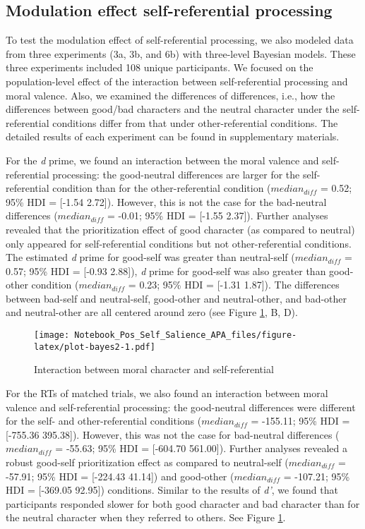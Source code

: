 \documentclass[
  man]{apa6}
\begin{document}
\hypertarget{modulation-effect-self-referential-processing}{%
\subsection{Modulation effect self-referential processing}\label{modulation-effect-self-referential-processing}}

To test the modulation effect of self-referential processing, we also modeled data from three experiments (3a, 3b, and 6b) with three-level Bayesian models. These three experiments included 108 unique participants. We focused on the population-level effect of the interaction between self-referential processing and moral valence. Also, we examined the differences of differences, i.e., how the differences between good/bad characters and the neutral character under the self-referential conditions differ from that under other-referential conditions. The detailed results of each experiment can be found in supplementary materials.

For the \emph{d} prime, we found an interaction between the moral valence and self-referential processing: the good-neutral differences are larger for the self-referential condition than for the other-referential condition (\(median_{diff}\) = 0.52; 95\% HDI = {[}-1.54 2.72{]}). However, this is not the case for the bad-neutral differences (\(median_{diff}\) = -0.01; 95\% HDI = {[}-1.55 2.37{]}). Further analyses revealed that the prioritization effect of good character (as compared to neutral) only appeared for self-referential conditions but not other-referential conditions. The estimated \emph{d} prime for good-self was greater than neutral-self (\(median_{diff}\) = 0.57; 95\% HDI = {[}-0.93 2.88{]}), \emph{d} prime for good-self was also greater than good-other condition (\(median_{diff}\) = 0.23; 95\% HDI = {[}-1.31 1.87{]}). The differences between bad-self and neutral-self, good-other and neutral-other, and bad-other and neutral-other are all centered around zero (see Figure \ref{fig:plot-bayes2}, B, D).

\begin{figure}
\centering
\texttt{[image: Notebook\_Pos\_Self\_Salience\_APA\_files/figure-latex/plot-bayes2-1.pdf]}
\caption{\label{fig:plot-bayes2}Interaction between moral character and self-referential}
\end{figure}

For the RTs of matched trials, we also found an interaction between moral valence and self-referential processing: the good-neutral differences were different for the self- and other-referential conditions (\(median_{diff}\) = -155.11; 95\% HDI = {[}-755.36 395.38{]}). However, this was not the case for bad-neutral differences (\(median_{diff}\) = -55.63; 95\% HDI = {[}-604.70 561.00{]}). Further analyses revealed a robust good-self prioritization effect as compared to neutral-self (\(median_{diff}\) = -57.91; 95\% HDI = {[}-224.43 41.14{]}) and good-other (\(median_{diff}\) = -107.21; 95\% HDI = {[}-369.05 92.95{]}) conditions. Similar to the results of \emph{d'}, we found that participants responded slower for both good character and bad character than for the neutral character when they referred to others. See Figure \ref{fig:plot-bayes2}.
\end{document}
